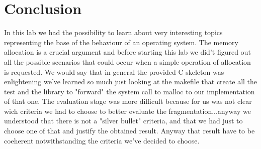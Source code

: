 \documentclass[11pt]{article}
\begin{document}
\section{Conclusion}
In this lab we had the possibility to learn about very interesting topics representing the base of the behaviour of an operating system. The memory allocation is a crucial argument and before starting this lab we did't figured out all the possible scenarios that could occur when a simple operation of allocation is requested. We would say that in general the provided C skeleton was enlightening we've learned so much just looking at the makefile that create all the test and the library to "forward" the system call to malloc to our implementation of that one. The evaluation stage was more difficult because for us was not clear wich criteria we had to choose to better evaluate the fragmentation...anyway we understood that there is not a "silver bullet" criteria, and that we had just to choose one of that and justify the obtained result. Anyway that result have to be coeherent notwithstanding the criteria we've decided to choose.
\end{document}
